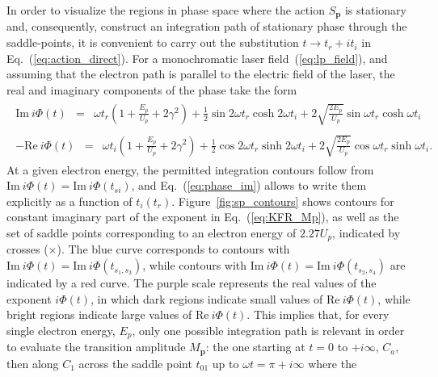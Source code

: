In order to visualize the regions in phase space where the action
$S_{\mathbf{p}}$ is stationary and, consequently, construct an
integration path of stationary phase through the saddle-points, it is
convenient to carry out the substitution $t \to t_{r} + it_{i}$ in
Eq.~(\ref{eq:action_direct}). For a monochromatic laser
field~(\ref{eq:lp_field}), and assuming that the electron path is
parallel to the electric field of the laser, the real and imaginary
components of the phase take the form~\cite{phd_Kopold}
%
\begin{eqnarray}
  \label{eq:phase_im}
  \begin{split}
    \mathrm{Im}\ i\Phi(t) & = & \omega t_{r} ( 1 + \frac{E_{p}}{U_{p}}
    + 2\gamma^{2} ) +
    \frac{1}{2} \sin 2\omega t_{r} \cosh 2\omega t_{i}
    + 2\sqrt{\frac{2E_{p}}{U_{p}}} \sin\omega t_{r} \cosh\omega t_{i}
  \end{split}
\end{eqnarray}
%
\begin{eqnarray}
  \label{eq:phase_re}
  \begin{split}
    -\mathrm{Re}\ i\Phi(t) & = & \omega t_{i} (
    1 + \frac{E_{p}}{U_{p}} + 2\gamma^{2} )
    + \frac{1}{2} \cos 2\omega t_{r} \sinh 2\omega t_{i}
    + 2\sqrt{\frac{2E_{p}}{U_{p}}} \cos\omega t_{r} \sinh\omega t_{i}.
  \end{split}
\end{eqnarray}
%
At a given electron energy, the permitted integration contours follow
from $\mathrm{Im}\ i \Phi(t) = \mathrm{Im}\ i \Phi(t_{si})$, and
Eq.~(\ref{eq:phase_im}) allows to write them explicitly as a function
of $t_{i}(t_{r})$. Figure~\ref{fig:sp_contours} shows contours for
constant imaginary part of the exponent in Eq.~(\ref{eq:KFR_Mp}), as
well as the set of saddle points corresponding to an electron energy
of $2.27 U_{p}$, indicated by crosses ($\times$). The blue curve
corresponds to contours with $\mathrm{Im}\ i \Phi(t) = \mathrm{Im}\ i
\Phi(t_{s_{1},s_{3}})$, while contours with $\mathrm{Im}\ i \Phi(t) =
\mathrm{Im}\ i \Phi(t_{s_{2},s_{4}})$ are indicated by a red
curve. The purple scale represents the real values of the exponent
$i\Phi(t)$, in which dark regions indicate small values of
$\mathrm{Re}\ i\Phi(t)$, while bright regions indicate large values of
$\mathrm{Re}\ i\Phi(t)$. This implies that, for every single electron
energy, $E_{p}$, only one possible integration path is relevant in
order to evaluate the transition amplitude $M_{\mathbf{p}}$: the one
starting at $t = 0$ to $+i\infty$, $C_{a}$, then along $C_{1}$ across
the saddle point $t_{01}$ up to $\omega t = \pi + i\infty$ where the
